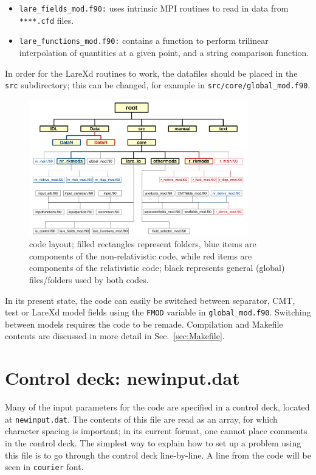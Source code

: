 \documentclass[a4paper,11pt,usenames,dvipsnames]{article}
\begin{document}
\begin{itemize}
 \item{\texttt{lare\_fields\_mod.f90:}} uses intrinsic MPI routines to read in data from \verb|****.cfd| files.
 \item{\texttt{lare\_functions\_mod.f90:}} contains a function to perform trilinear interpolation of quantities at a given point, and a string comparison function.
\end{itemize}
In order for the LareXd routines to work, the datafiles should be placed in the \texttt{src} subdirectory; this can be changed, for example in \texttt{src/core/global\_mod.f90}.

\begin{figure}[t]
 \centering
 \includegraphics[width=0.85\textwidth]{rnrcode_layoutv2.png}
 \caption{code layout; filled rectangles represent folders, blue items are components of the non-relativistic code, while red items are components of the relativistic code; black represents general (global) files/folders used by both codes.} 
 \label{fig:codelayout}
\end{figure}
\noindent In its present state, the code can easily be switched between separator, CMT, test or LareXd model fields using the \texttt{FMOD} variable in \texttt{global\_mod.f90}. Switching between models requires the code to be remade. Compilation and Makefile contents are discussed in more detail in Sec.~\ref{sec:Makefile}.

\section{Control deck: newinput.dat}\label{sec:controldeck}
Many of the input parameters for the code are specified in a control deck, located at \texttt{newinput.dat}. The contents of this file are read as an array, for which character spacing is important; in its current format, one cannot place comments in the control deck. The simplest way to explain how to set up a problem using this file is to go through the control deck line-by-line. A line from the code will be seen in \texttt{courier} font. \hspace{2mm}\\ 
\end{document}
